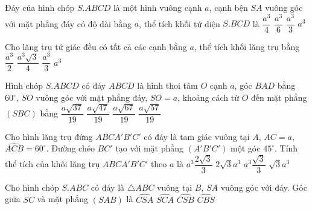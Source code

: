 \begin{ex}%
Đáy của hình chóp $S.ABCD$ là một hình vuông cạnh $a$, cạnh bện $SA$ vuông góc với mặt phẳng đáy có độ dài bằng $a$, thể tích khối tứ diện $S.BCD$ là
\choice
{$\dfrac{a^3}{4}$}
{\True $\dfrac{a^3}{6}$}
{$\dfrac{a^3}{3}$}
{$a^3$}
\end{ex}

\begin{ex}%
Cho lăng trụ tứ giác đều có tất cả các cạnh bằng $a$, thể tích khối lăng trụ bằng
\choice
{$\dfrac{a^3}{2}$}
{$\dfrac{a^3\sqrt{3}}{4}$}
{$\dfrac{a^3}{3}$}
{\True $a^3$}
\end{ex}

\begin{ex}%
Hình chóp $S.ABCD$ có đáy $ABCD$ là hình thoi tâm $O$ cạnh $a$, góc $BAD$ bằng $60^{\circ}$, $SO$ vuông góc với mặt phẳng đáy, $SO=a$, khoảng cách từ $O$ đến mặt phẳng $(SBC)$ bằng
\choice
{$\dfrac{a\sqrt{37}}{19}$}
{$\dfrac{a\sqrt{47}}{19}$}
{$\dfrac{a\sqrt{67}}{19}$}
{\True $\dfrac{a\sqrt{57}}{19}$}
\end{ex}

\begin{ex}%
Cho hình lăng trụ đứng $ABCA'B'C'$ có đáy là tam giác vuông tại $A$, $AC=a$, $\widehat{ACB}=60^{\circ}$. Đường chéo $BC'$ tạo với mặt phẳng $(A'B'C')$ một góc $45^{\circ}$. Tính thể tích của khôi lăng trụ $ABCA'B'C'$ theo $a$ là
\choice
{$a^3\dfrac{2\sqrt{3}}{3}$}
{$2\sqrt{3}a^3$}
{$a^3\dfrac{\sqrt{3}}{3}$}
{\True $\sqrt{3}a^3$}
\end{ex}

\begin{ex}%
Cho hình chóp $S.ABC$ có đáy là $\bigtriangleup ABC$ vuông tại $B$, $SA$ vuông góc với đáy. Góc giữa $SC$ và mặt phẳng $(SAB)$ là
\choice
{$\widehat{CSA}$}
{$\widehat{SCA}$}
{\True $\widehat{CSB}$}
{$\widehat{CBS}$}
\end{ex}

